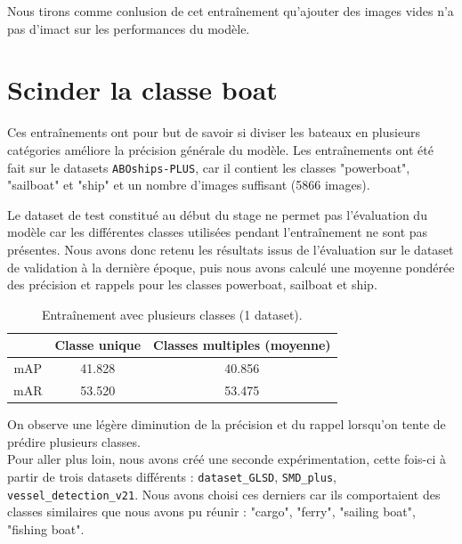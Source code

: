 Nous tirons comme conlusion de cet entraînement qu'ajouter des images vides 
n'a pas d'imact sur les performances du modèle.

\section{Scinder la classe boat}

Ces entraînements ont pour but de savoir si diviser les bateaux en plusieurs 
catégories améliore la précision générale du modèle. 
Les entraînements ont été fait sur le datasets \texttt{ABOships-PLUS}, 
car il contient les classes "powerboat", "sailboat" et "ship" 
et un nombre d'images suffisant (5866 images).  
 
Le dataset de test constitué au début du stage ne permet pas l'évaluation du modèle 
car les différentes classes utilisées pendant l'entraînement ne sont pas présentes. 
Nous avons donc retenu les résultats issus de l'évaluation sur le dataset de validation 
à la dernière époque, puis nous avons calculé une moyenne pondérée des précision 
et rappels pour les classes powerboat, sailboat et ship. \\

\begin{table}[h]
    \begin{center}
        \begin{tabular}{c c c}
            \hline
            & Classe unique & Classes multiples (moyenne) \\
            \hline
            mAP & 41.828 & 40.856 \\
            mAR & 53.520 & 53.475 \\
        \end{tabular}
    \end{center}
    \caption{Entraînement avec plusieurs classes (1 dataset).}
\end{table}

On observe une légère diminution de la précision et du rappel lorsqu'on tente de prédire plusieurs
classes. \\

Pour aller plus loin, nous avons créé une seconde expérimentation, cette fois-ci à partir 
de trois datasets différents : \texttt{dataset\_GLSD}, \texttt{SMD\_plus}, \texttt{vessel\_detection\_v21}. 
Nous avons choisi ces derniers car ils comportaient des classes similaires que nous avons pu réunir : 
"cargo", "ferry", "sailing boat", "fishing boat". \\

